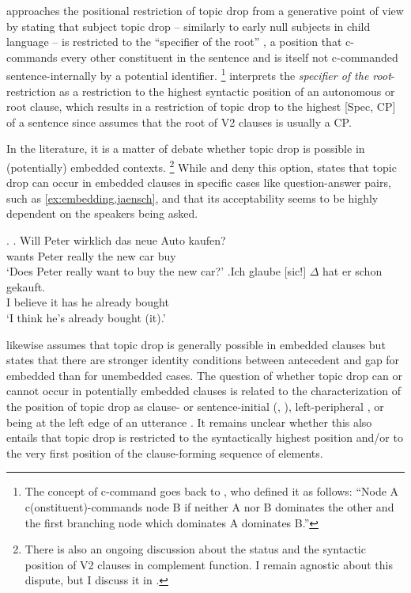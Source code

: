 \citet{rizzi1994} approaches the positional restriction of topic drop from a generative point of view by stating that subject topic drop -- similarly to early null subjects  in child language -- is restricted to the ``specifier of the root'' \citep[155]{rizzi1994}, a position that c-commands  every other constituent in the sentence and is itself not c-commanded sentence-internally by a potential identifier.%
\footnote{The concept of c-command  goes back to \citet[32]{reinhart1976}, who defined it as follows:
``Node A c(onstituent)-commands node B if neither A nor B dominates the other and the first branching node which dominates A dominates B.''
}
%
\citet[167]{freywald2020} interprets the \textit{specifier of the root}-restriction as a restriction to the highest syntactic position of an autonomous or root clause, which results in a restriction of topic drop to the highest [Spec, CP] of a sentence since \citet{rizzi1994} assumes that the root of V2 clauses is usually a CP. 

In the literature, it is a matter of debate whether topic drop is possible in (potentially) embedded  contexts.%
\footnote{There is also an ongoing discussion about the status and the syntactic position of V2 clauses in complement function.
I remain agnostic about this dispute, but I discuss it in .}
%
While \citet[76]{cardinaletti1990} and \citet[272]{volodina2011} deny this option, \citet[101]{jaensch2005} states that topic drop can occur in embedded clauses in specific cases like question-answer pairs, such as \ref{ex:embedding.jaensch}, and that its acceptability seems to be highly dependent on the speakers being asked.

\ex.\label{ex:embedding.jaensch}
\ag.	Will Peter wirklich das neue Auto kaufen?\\
wants Peter really the new car buy \\
`Does Peter really want to buy the new car?'
\bg.Ich glaube [sic!] $\Delta$ hat er schon gekauft.\\
I believe {} it has he already bought\\
`I think he’s already bought (it).' \citep[98, her judgment]{jaensch2005}
 
\citet[224--225]{trutkowski2016} likewise assumes that topic drop is generally possible in embedded  clauses but states that there are stronger identity conditions between antecedent  and gap for embedded than for unembedded cases.
The question of whether topic drop can or cannot occur in potentially embedded clauses is related to the characterization of the position of topic drop as clause- or sentence-initial (\cite[547]{huang1984}, \cite[1]{trutkowski2016}), left-peripheral \citep[150]{freywald2020}, or being at the left edge of an utterance \citep[99]{ackema.neeleman2007}.
It remains unclear whether this also entails that topic drop is restricted to the syntactically highest position and/or to the very first position of the clause-forming sequence of elements.

